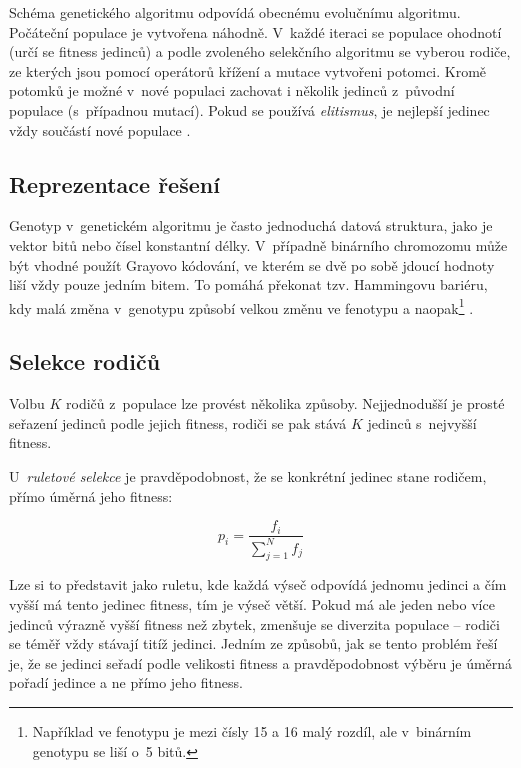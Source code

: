 
Schéma genetického algoritmu odpovídá obecnému evolučnímu algoritmu. Počáteční populace je vytvořena náhodně. V~každé iteraci se populace ohodnotí (určí se fitness jedinců) a podle zvoleného selekčního algoritmu se vyberou rodiče, ze kterých jsou pomocí operátorů křížení a mutace vytvořeni potomci. Kromě potomků je možné v~nové populaci zachovat i několik jedinců z~původní populace (s~případnou mutací). Pokud se používá \emph{elitismus}, je nejlepší jedinec vždy součástí nové populace \cite{Modra, HandbookGA}.


\subsection{Reprezentace řešení}

Genotyp v~genetickém algoritmu je často jednoduchá datová struktura, jako je vektor bitů nebo čísel konstantní délky. V~případně binárního chromozomu může být vhodné použít Grayovo kódování, ve kterém se dvě po sobě jdoucí hodnoty liší vždy pouze jedním bitem. To pomáhá překonat tzv. Hammingovu bariéru, kdy malá změna v~genotypu způsobí velkou změnu ve fenotypu a naopak\footnote{Například ve fenotypu je mezi čísly 15 a 16 malý rozdíl, ale v~binárním genotypu se liší o~5 bitů.} \cite{HandbookGA}.


\subsection{Selekce rodičů}

Volbu $K$ rodičů z~populace lze provést několika způsoby. Nejjednodušší je prosté seřazení jedinců podle jejich fitness, rodiči se pak stává $K$ jedinců s~nejvyšší fitness.

U~\emph{ruletové selekce} je pravděpodobnost, že se konkrétní jedinec stane rodičem, přímo úměrná jeho fitness:

\begin{equation*}
p_i = \frac{f_i}{\sum_{j=1}^N{f_j}}
\end{equation*}

\noindent{}Lze si to představit jako ruletu, kde každá výseč odpovídá jednomu jedinci a čím vyšší má tento jedinec fitness, tím je výseč větší. Pokud má ale jeden nebo více jedinců výrazně vyšší fitness než zbytek, zmenšuje se diverzita populace -- rodiči se téměř vždy stávají titíž jedinci. Jedním ze způsobů, jak se tento problém řeší je, že se jedinci seřadí podle velikosti fitness a pravděpodobnost výběru je úměrná pořadí jedince a ne přímo jeho fitness.

